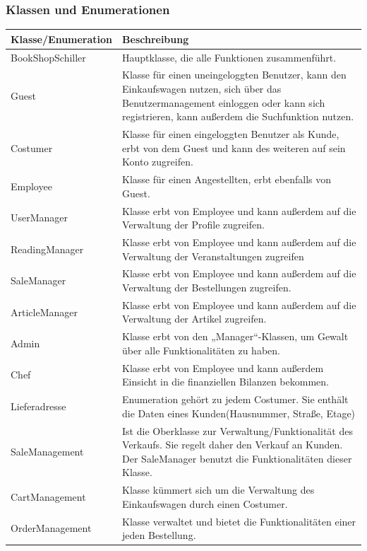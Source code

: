 \documentclass[a4paper]{article}
\begin{document}
\subsubsection{Klassen und Enumerationen}

\begin{longtable}{|p{100px}|p{250px}|}
	\hline
	\rowcolor[HTML]{C0C0C0} 
	Klasse/Enumeration & Beschreibung \\ \hline
	BookShopSchiller & Hauptklasse, die alle Funktionen zusammenführt. \\ \hline
	Guest & Klasse für einen  uneingeloggten Benutzer, kann den Einkaufswagen nutzen, sich über das Benutzermanagement einloggen oder kann sich registrieren, kann außerdem die Suchfunktion nutzen. \\ \hline
	Costumer & Klasse für einen eingeloggten Benutzer als Kunde, erbt von dem Guest und kann des weiteren auf sein Konto zugreifen. \\ \hline
	Employee & Klasse für einen Angestellten, erbt ebenfalls von Guest.  \\ \hline
	UserManager & Klasse erbt von Employee und kann außerdem auf die Verwaltung der Profile zugreifen. \\ \hline
	ReadingManager & Klasse erbt von Employee und kann außerdem auf die Verwaltung der Veranstaltungen zugreifen \\ \hline
	SaleManager & Klasse erbt von Employee und kann außerdem auf die Verwaltung der Bestellungen zugreifen. \\ \hline
	ArticleManager & Klasse erbt von Employee und kann außerdem auf die Verwaltung der Artikel zugreifen. \\ \hline
	Admin & Klasse erbt von den „Manager“-Klassen, um Gewalt über alle Funktionalitäten zu haben. \\ \hline
	Chef & Klasse erbt von Employee und kann außerdem Einsicht in die finanziellen Bilanzen bekommen. \\ \hline
	Lieferadresse & Enumeration gehört zu jedem Costumer. Sie enthält die Daten eines Kunden(Hausnummer, Straße, Etage) \\ \hline
	SaleManagement & Ist die Oberklasse zur Verwaltung/Funktionalität des Verkaufs. Sie regelt daher den Verkauf an Kunden. Der SaleManager benutzt die Funktionalitäten dieser Klasse. \\ \hline
	CartManagement & Klasse kümmert sich um die Verwaltung des Einkaufswagen durch einen Costumer. \\ \hline
	OrderManagement & Klasse verwaltet und bietet die Funktionalitäten einer jeden Bestellung. \\ \hline

\end{longtable}
\end{document}
